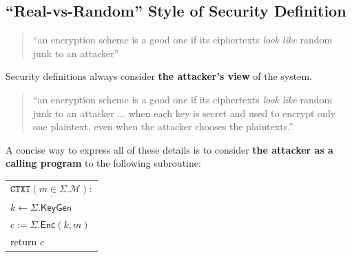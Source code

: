 \documentclass[12pt,openany]{book}
\theoremstyle{definition}
\newcommand{\KeyGen}{\mathsf{KeyGen}}
\newcommand{\Enc}{\mathsf{Enc}}
\newcommand{\scheme}{\Sigma}
\newcommand{\messagespace}{\mathcal{M}}
\newcommand{\tab}{\hspace{8pt}}
\begin{document}
	\subsection{``Real-vs-Random'' Style of Security Definition}
	\begin{quote}
		``an encryption scheme is a good one if its ciphertexts \textit{look like} random junk to an attacker''
	\end{quote}

	Security definitions always consider \textbf{the attacker's view} of the system.
	\begin{quote}
		``an encryption scheme is a good one if its ciphertexts \textit{look like} random junk to an attacker ... when each key is secret and used to encrypt only one plaintext, even when the attacker chooses the plaintexts.''
	\end{quote}

	
	A concise way to express all of these details is to consider \textbf{the attacker as a calling	program} to the following subroutine:
	\begin{center}
		\begin{tabular}{|l|}
			\hline
			$\underline{\texttt{CTXT}(m\in\scheme.\messagespace):}$\\
			\tab$k\gets\scheme.\KeyGen$\\
			\tab$c:=\scheme.\Enc(k,m)$\\
			\tab return $c$\\
			\hline
		\end{tabular}\\
	\end{center}
	
\end{document}
